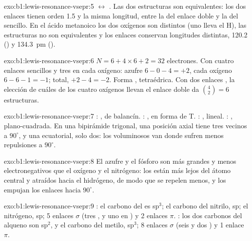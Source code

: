 \begin{solution}{exo:b1:lewis-resonance-vsepr:5}
$\leftrightarrow$
.
Las dos estructuras son equivalentes: los dos enlaces  tienen
orden 1.5 y la misma longitud, entre la del enlace doble y la del
sencillo. En el ácido metanoico los dos oxígenos son distintos (uno lleva
el H), las estructuras no son equivalentes y los enlaces conservan
longitudes distintas, 120.2 () y \qty{134.3}{pm} ().
\end{solution}

\begin{solution}{exo:b1:lewis-resonance-vsepr:6}
$N = 6 + 4 \times 6 + 2 = 32$ electrones. Con cuatro enlaces sencillos y
tres  en cada oxígeno: azufre $6 - 0 - 4 = +2$, cada
oxígeno $6 - 6 - 1 = -1$; total, $+2 - 4 = -2$. Forma ,
tetraédrica. Con dos enlaces , la elección de cuáles de los
cuatro oxígenos llevan el enlace doble da $\binom{4}{2} = 6$ estructuras.
\end{solution}

\begin{solution}{exo:b1:lewis-resonance-vsepr:7}
: , de balancín. : , en forma de T.
: , lineal. : , plano-cuadrada. En
una bipirámide trigonal, una posición axial tiene tres vecinos a
$90^\circ$, y una ecuatorial, solo dos: los voluminosos  van donde sufren menos repulsiones a $90^\circ$.
\end{solution}

\begin{solution}{exo:b1:lewis-resonance-vsepr:8}
El azufre y el fósforo son más grandes y menos electronegativos que el
oxígeno y el nitrógeno: los  están más lejos del átomo
central y atraídos hacia el hidrógeno, de modo que se repelen menos, y
los  empujan los enlaces hacia $90^\circ$.
\end{solution}

\begin{solution}{exo:b1:lewis-resonance-vsepr:9}
: el carbono del  es sp$^3$; el carbono del nitrilo,
sp; el nitrógeno, sp; 5 enlaces $\sigma$ (tres ,  y uno en
) y 2 enlaces $\pi$. : los dos carbonos del
alqueno son sp$^2$, y el carbono del metilo, sp$^3$; 8 enlaces $\sigma$
(seis  y dos ) y 1 enlace $\pi$.
\end{solution}

